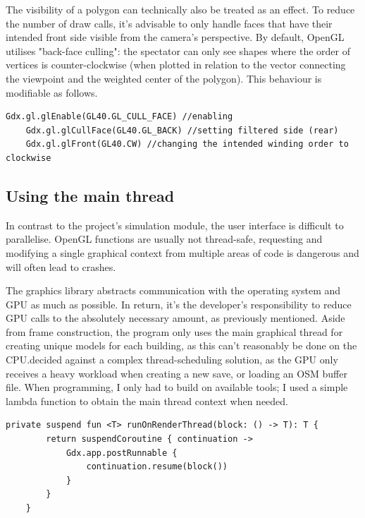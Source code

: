 The visibility of a polygon can technically also be treated as an effect. To reduce the number of draw calls, it's advisable to only handle faces that have their intended front side visible from the camera's perspective. By default, OpenGL utilises "back-face culling": the spectator can only see shapes where the order of vertices is counter-clockwise (when plotted in relation to the vector connecting the viewpoint and the weighted center of the polygon). This behaviour is modifiable as follows.

\begin{lstlisting}[caption=Example for changing OpenGL's culling properties through libGDX]
    Gdx.gl.glEnable(GL40.GL_CULL_FACE) //enabling
    Gdx.gl.glCullFace(GL40.GL_BACK) //setting filtered side (rear)
    Gdx.gl.glFront(GL40.CW) //changing the intended winding order to clockwise
\end{lstlisting}

\subsection{Using the main thread}

In contrast to the project's simulation module, the user interface is difficult to parallelise. OpenGL functions are usually not thread-safe, requesting and modifying a single graphical context from multiple areas of code is dangerous and will often lead to crashes.

The graphics library abstracts communication with the operating system and GPU as much as possible. In return, it's the developer's responsibility to reduce GPU calls to the absolutely necessary amount, as previously mentioned. Aside from frame construction, the program only uses the main graphical thread for creating unique models for each building, as this can't reasonably be done on the CPU.\@I decided against a complex thread-scheduling solution, as the GPU only receives a heavy workload when creating a new save, or loading an OSM buffer file. When programming, I only had to build on available tools; I used a simple lambda function to obtain the main thread context when needed.

\begin{lstlisting}[caption=Helper function for getting the draw thread]
private suspend fun <T> runOnRenderThread(block: () -> T): T {
        return suspendCoroutine { continuation ->
            Gdx.app.postRunnable {
                continuation.resume(block())
            }
        }
    }
\end{lstlisting}


